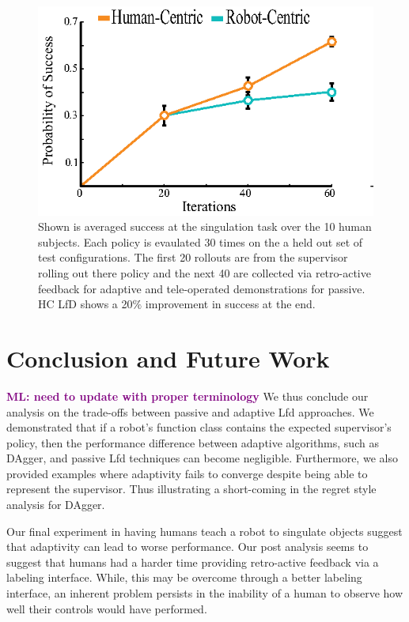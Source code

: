 \documentclass[10pt, conference]{ieeeconf}      %
\newcommand{\mlnote}[1]{\ifthenelse{ \boolean{include-notes}}%
 {\textcolor{purple}{\textbf{ML: #1}}}{}}
\begin{document}
\begin{figure}
\centering
\includegraphics{f_figs/izzy_reward.eps}
\caption{
    \footnotesize
Shown is averaged success at the singulation task over the 10 human subjects. Each policy is evaulated 30 times on the a held out set of test configurations. The first 20 rollouts are from the supervisor rolling out there policy and the next 40 are collected via retro-active feedback for adaptive and tele-operated demonstrations for passive. HC LfD shows a 20$\%$ improvement in success at the end. }

\label{fig:izzy_rw}
\end{figure}


\section{Conclusion and Future Work}
\mlnote{need to update with proper terminology}
We thus conclude our analysis on the trade-offs between passive and adaptive Lfd approaches. We demonstrated that if a robot's function class contains the expected supervisor's policy, then the  performance difference between adaptive algorithms, such as DAgger,  and passive Lfd techniques can become negligible.  Furthermore, we also provided examples where adaptivity fails to converge despite being able to represent the supervisor. Thus illustrating a short-coming in the regret style analysis for DAgger. 

Our final experiment in having humans teach a robot to singulate objects suggest that adaptivity can lead to worse performance. Our post analysis seems to suggest that humans had a harder time providing retro-active feedback via a labeling interface. While, this may be overcome through a better labeling interface, an inherent problem persists in the inability of a human to observe how well their controls would have performed. 
\end{document}
